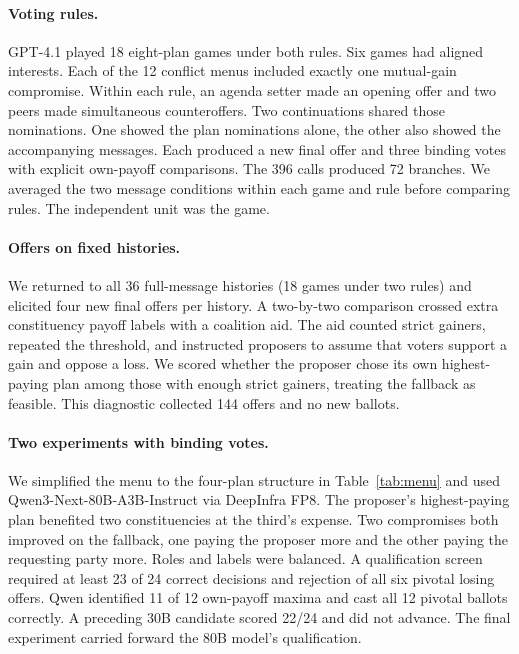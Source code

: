 \documentclass[11pt]{article}
\begin{document}
\paragraph{Voting rules.} GPT-4.1 played 18 eight-plan games under both rules. Six games had aligned interests. Each of the 12 conflict menus included exactly one mutual-gain compromise. Within each rule, an agenda setter made an opening offer and two peers made simultaneous counteroffers. Two continuations shared those nominations. One showed the plan nominations alone, the other also showed the accompanying messages. Each produced a new final offer and three binding votes with explicit own-payoff comparisons. The 396 calls produced 72 branches. We averaged the two message conditions within each game and rule before comparing rules. The independent unit was the game.

\paragraph{Offers on fixed histories.} We returned to all 36 full-message histories (18 games under two rules) and elicited four new final offers per history. A two-by-two comparison crossed extra constituency payoff labels with a coalition aid. The aid counted strict gainers, repeated the threshold, and instructed proposers to assume that voters support a gain and oppose a loss. We scored whether the proposer chose its own highest-paying plan among those with enough strict gainers, treating the fallback as feasible. This diagnostic collected 144 offers and no new ballots.

\paragraph{Two experiments with binding votes.} We simplified the menu to the four-plan structure in Table~\ref{tab:menu} and used Qwen3-Next-80B-A3B-Instruct via DeepInfra FP8. The proposer's highest-paying plan benefited two constituencies at the third's expense. Two compromises both improved on the fallback, one paying the proposer more and the other paying the requesting party more. Roles and labels were balanced. A qualification screen required at least 23 of 24 correct decisions and rejection of all six pivotal losing offers. Qwen identified 11 of 12 own-payoff maxima and cast all 12 pivotal ballots correctly. A preceding 30B candidate scored 22/24 and did not advance. The final experiment carried forward the 80B model's qualification.
\end{document}
